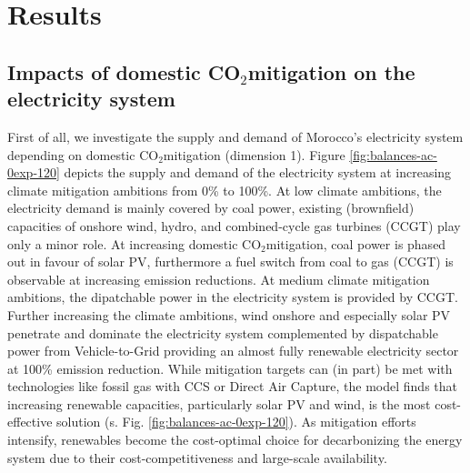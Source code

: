 \documentclass[5p,numafflabel]{elsarticle}
\newcommand{\co}{\ce{CO2}~}
\def\co{CO${}_2${\:}}
\begin{document}

% 



\section*{Results}
\label{sec:results}





\subsection*{Impacts of domestic \co mitigation on the electricity system}
\label{subsec:increase_limit}
First of all, we investigate the supply and demand of Morocco's electricity system depending on domestic \co mitigation (dimension 1). Figure \ref{fig:balances-ac-0exp-120} depicts the supply and demand of the electricity system at increasing climate mitigation ambitions from 0\% to 100\%. At low climate ambitions, the electricity demand is mainly covered by coal power, existing (brownfield) capacities of onshore wind, hydro, and combined-cycle gas turbines (CCGT) play only a minor role. 
At increasing domestic \co mitigation, coal power is phased out in favour of solar PV, furthermore a fuel switch from coal to gas (CCGT) is observable at increasing emission reductions. At medium climate mitigation ambitions, the dipatchable power in the electricity system is provided by CCGT. 
Further increasing the climate ambitions, wind onshore and especially solar PV penetrate and dominate the electricity system complemented by dispatchable power from Vehicle-to-Grid providing an almost fully renewable electricity sector at 100\% emission reduction. 
While mitigation targets can (in part) be met with technologies like fossil gas with CCS or Direct Air Capture, the model finds that increasing renewable capacities, particularly solar PV and wind, is the most cost-effective solution (s. Fig. \ref{fig:balances-ac-0exp-120}). As mitigation efforts intensify, renewables become the cost-optimal choice for decarbonizing the energy system due to their cost-competitiveness and large-scale availability.
\end{document}
